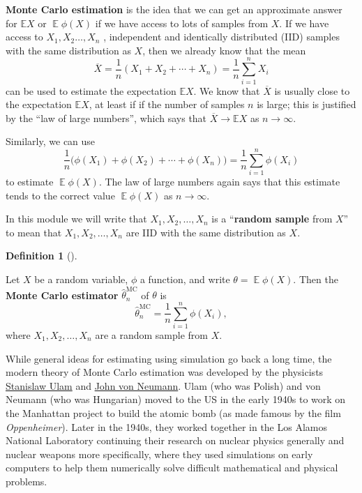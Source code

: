 \documentclass[
  letterpaper,
  DIV=11,
  numbers=noendperiod]{scrreprt}
\newcommand{\Exg}{\operatorname{\mathbb{E}}}
\newcommand{\Ex}{\mathbb{E}}
\theoremstyle{plain}
\theoremstyle{definition}
\newtheorem{definition}{Definition}[chapter]
\theoremstyle{definition}
\theoremstyle{remark}
\begin{document}
\textbf{Monte Carlo estimation} is the idea that we can get an
approximate answer for \(\Ex X\) or \(\Exg \phi(X)\) if we have access
to lots of samples from \(X\). If we have access to
\(X_1, X_2 \dots, X_n\) , independent and identically distributed (IID)
samples with the same distribution as \(X\), then we already know that
the mean
\[ \overline X = \frac{1}{n}(X_1 + X_2 + \cdots + X_n) = \frac{1}{n} \sum_{i=1}^n X_i \]
can be used to estimate the expectation \(\mathbb EX\). We know that
\(\overline X\) is usually close to the expectation \(\Ex X\), at least
if if the number of samples \(n\) is large; this is justified by the
``law of large numbers'', which says that \(\overline X \to \mathbb EX\)
as \(n \to \infty\).

Similarly, we can use
\[ \frac{1}{n} \big(\phi(X_1) + \phi(X_2) + \cdots + \phi(X_n) \big) = \frac{1}{n} \sum_{i=1}^n \phi(X_i) \]
to estimate \(\Exg \phi(X)\). The law of large numbers again says that
this estimate tends to the correct value \(\Exg \phi(X)\) as
\(n \to \infty\).

In this module we will write that \(X_1, X_2, \dots, X_n\) is a
``\textbf{random sample} from \(X\)'' to mean that
\(X_1, X_2, \dots, X_n\) are IID with the same distribution as \(X\).

\begin{definition}[]\protect\hypertarget{def-MCest}{}\label{def-MCest}

Let \(X\) be a random variable, \(\phi\) a function, and write
\(\theta = \Exg\phi(X)\). Then the \textbf{Monte Carlo estimator}
\(\widehat\theta_n^{\mathrm{MC}}\) of \(\theta\) is
\[ \widehat{\theta}_n^{\mathrm{MC}} = \frac{1}{n} \sum_{i=1}^n \phi(X_i) , \]
where \(X_1, X_2, \dots, X_n\) are a random sample from \(X\).

\end{definition}

While general ideas for estimating using simulation go back a long time,
the modern theory of Monte Carlo estimation was developed by the
physicists \href{https://en.wikipedia.org/wiki/Stanisław_Ulam}{Stanislaw
Ulam} and \href{https://en.wikipedia.org/wiki/John_von_Neumann}{John von
Neumann}. Ulam (who was Polish) and von Neumann (who was Hungarian)
moved to the US in the early 1940s to work on the Manhattan project to
build the atomic bomb (as made famous by the film \emph{Oppenheimer}).
Later in the 1940s, they worked together in the Los Alamos National
Laboratory continuing their research on nuclear physics generally and
nuclear weapons more specifically, where they used simulations on early
computers to help them numerically solve difficult mathematical and
physical problems.
\end{document}
